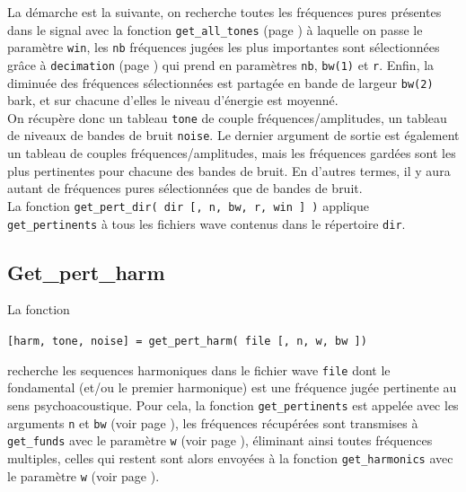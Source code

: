     La d{\'e}marche est la suivante, on recherche toutes les fr{\'e}quences
    pures pr{\'e}sentes dans le signal avec la fonction {\tt get\_all\_tones}
    (page \pageref{getalltones}) {\`a} laquelle on passe le param{\`e}tre
    {\tt win}, les {\tt nb} fr{\'e}quences jug{\'e}es les plus importantes sont
    s{\'e}lectionn{\'e}es gr{\^a}ce {\`a} {\tt decimation} (page \pageref{decimation})
    qui prend en param{\`e}tres {\tt nb}, {\tt bw(1)} et {\tt r}.
    Enfin, la \dsp diminu{\'e}e des fr{\'e}quences s{\'e}lectionn{\'e}es est
    partag{\'e}e en bande de largeur {\tt bw(2)} bark, et sur chacune d'elles
    le niveau d'{\'e}nergie est moyenn{\'e}.\\

    On r{\'e}cup{\`e}re donc un tableau {\tt tone} de couple
    fr{\'e}quences/amplitudes, un tableau de niveaux de bandes de
    bruit {\tt noise}. Le dernier argument de sortie est
    {\'e}galement un tableau de couples fr{\'e}quences/amplitudes, mais
    les fr{\'e}quences gard{\'e}es sont les plus pertinentes pour chacune
    des bandes de bruit. En d'autres termes, il y aura autant de
    fr{\'e}quences pures s{\'e}lectionn{\'e}es que de bandes de bruit.\\

    La fonction {\tt get\_pert\_dir( dir [, n, bw, r, win ] )}
    applique {\tt get\_pertinents} {\`a} tous les fichiers wave
    contenus dans le r{\'e}pertoire {\tt dir}.


    \newpage
    \subsection{Get\_pert\_harm}
    \label{getpertharm}
    La fonction
    \begin{center}
    {\tt [harm, tone, noise] = get\_pert\_harm( file [, n, w, bw ])}
    \end{center}
    recherche les sequences harmoniques dans le fichier wave
    {\tt file} dont le fondamental (et/ou le premier harmonique)
    est une fr{\'e}quence jug{\'e}e pertinente au sens psychoacoustique.
    Pour cela, la fonction {\tt get\_pertinents} est appel{\'e}e avec
    les arguments {\tt n} et {\tt bw} (voir page \pageref{getpertinents}),
    les fr{\'e}quences r{\'e}cup{\'e}r{\'e}es sont transmises {\`a} {\tt get\_funds}
    avec le param{\`e}tre {\tt w} (voir page \pageref{getfunds}),
    {\'e}liminant ainsi toutes fr{\'e}quences multiples, celles qui restent
    sont alors envoy{\'e}es {\`a} la fonction {\tt get\_harmonics} avec le
    param{\`e}tre {\tt w} (voir page \pageref{getharmonics}).\\

